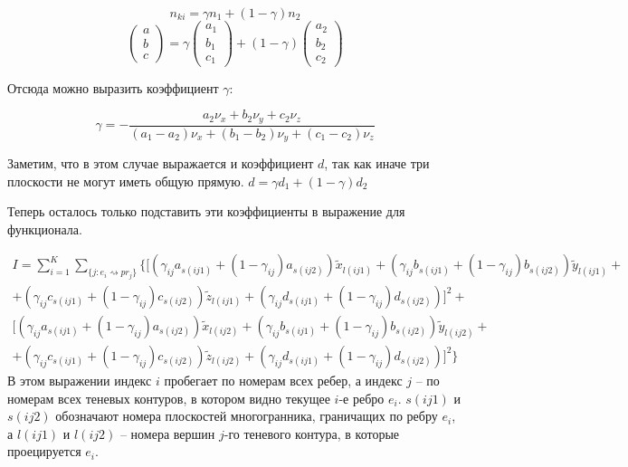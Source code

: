 \documentclass[a4paper,12pt, titlepage]{article}
\begin{document}
\begin{flushleft}
 $$ n_{ki} = \gamma n_{1} + (1 - \gamma) n_{2} $$
 $$\begin{pmatrix} a \\ b \\ c \end{pmatrix} = 
 \gamma \begin{pmatrix} a_{1} \\ b_{1} \\ c_{1} \end{pmatrix} + 
 (1 - \gamma) \begin{pmatrix} a_{2} \\ b_{2} \\ c_{2} \end{pmatrix} 
 $$
\end{flushleft}

\begin{flushleft}
 Отсюда можно выразить коэффициент $\gamma$:
 
\begin{equation}
 \gamma = - \frac{a_{2}\nu_{x} + b_{2}\nu_{y} + c_{2}\nu_{z}}
 {(a_{1} - a_{2})\nu_{x} + (b_{1} - b_{2})\nu_{y} + (c_{1} - c_{2})\nu_{z}}
\end{equation}
\end{flushleft}

\begin{flushleft}
 Заметим, что в этом случае выражается и коэффициент $d$, так как иначе три плоскости 
 не могут иметь общую прямую.
 $d = \gamma d_{1} + (1 - \gamma) d_{2}$
\end{flushleft}

\begin{flushleft}
 Теперь осталось только подставить эти коэффициенты в выражение для функционала.
 
 \begin{multline}
    I = \sum\limits_{i = 1}^{K} \sum\limits_{\{j:e_{i} \rightsquigarrow pr_{j}\}}
  \{
    [ 
      (\gamma_{ij} a_{s(ij1)} + (1 - \gamma_{ij}) a_{s(ij2)}) \tilde{x}_{l(ij1)} + 
      (\gamma_{ij} b_{s(ij1)} + (1 - \gamma_{ij}) b_{s(ij2)}) \tilde{y}_{l(ij1)} + \\ +
      (\gamma_{ij} c_{s(ij1)} + (1 - \gamma_{ij}) c_{s(ij2)}) \tilde{z}_{l(ij1)} + 
      (\gamma_{ij} d_{s(ij1)} + (1 - \gamma_{ij}) d_{s(ij2)}) 
    ]^{2} + \\
    [ 
      (\gamma_{ij} a_{s(ij1)} + (1 - \gamma_{ij}) a_{s(ij2)}) \tilde{x}_{l(ij2)} + 
      (\gamma_{ij} b_{s(ij1)} + (1 - \gamma_{ij}) b_{s(ij2)}) \tilde{y}_{l(ij2)} + \\ +
      (\gamma_{ij} c_{s(ij1)} + (1 - \gamma_{ij}) c_{s(ij2)}) \tilde{z}_{l(ij2)} + 
      (\gamma_{ij} d_{s(ij1)} + (1 - \gamma_{ij}) d_{s(ij2)}) 
    ]^{2}\}
 \end{multline}
 В этом выражении индекс $i$ пробегает по номерам всех ребер, а индекс $j$ -- по номерам всех 
 теневых контуров, в котором видно текущее $i$-е ребро $e_{i}$. $s(ij1)$ и $s(ij2)$ обозначают номера
 плоскостей многогранника, граничащих по ребру $e_{i}$, а $l(ij1)$ и $l(ij2)$ -- номера вершин
 $j$-го теневого контура, в которые проецируется $e_{i}$.
\end{flushleft}
\end{document}
